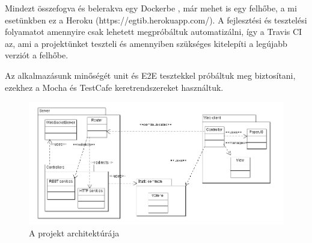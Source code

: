 Mindezt összefogva és belerakva egy Dockerbe \cite{soft:docker}, már mehet is egy felhőbe, a mi esetünkben ez a Heroku (https://egtib.herokuapp.com/). A fejlesztési és tesztelési folyamatot amennyire csak lehetett megpróbáltuk automatizálni, így a Travis CI \cite{soft:travis} az, ami a projektünket teszteli és amennyiben szükséges kitelepíti a legújabb verziót a felhőbe.

Az alkalmazásunk minőségét unit és E2E tesztekkel próbáltuk meg biztosítani, ezekhez a Mocha \cite{soft:mocha} és TestCafe \cite{soft:testcafe} keretrendszereket használtuk.

\begin{figure}[ht!]
	\centering
	\includegraphics[width=\linewidth]{images/Architecture}
	\caption{A projekt architektúrája\label{fig:Architecture}}
\end{figure}
